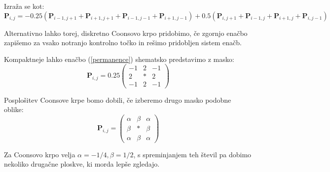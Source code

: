 \documentclass{article}
\begin{document}
Izraža se kot:
\begin{equation}
\textbf{P}_{i,j} = -0.25 (\textbf{P}_{i-1,j+1} + \textbf{P}_{i+1,j+1} + \textbf{P}_{i-1,j-1} + \textbf{P}_{i+1,j-1}) + 0.5 (\textbf{P}_{i,j+1} + \textbf{P}_{i-1,j} + \textbf{P}_{i+1,j} + \textbf{P}_{i,j-1})
\label{permanence}
\end{equation}

Alternativno lahko torej, diskretno Coonsovo krpo pridobimo, če zgornjo enačbo zapišemo za vsako notranjo kontrolno točko in rešimo pridobljen sistem enačb.

Kompaktneje lahko enačbo (\ref{permanence}) shematsko predstavimo z masko:
\begin{equation}
\textbf{P}_{i,j} = 0.25 \begin{pmatrix} -1  & 2 & -1 \\ 2 & * & 2 \\ -1 & 2 & -1\end{pmatrix}
\end{equation}

Posplošitev Coonsove krpe bomo dobili, če izberemo drugo masko podobne oblike:
\begin{equation}
\textbf{P}_{i,j} = \begin{pmatrix} \alpha  & \beta & \alpha \\ \beta & * & \beta \\ \alpha & \beta & \alpha\end{pmatrix}
\end{equation}

Za Coonsovo krpo velja $\alpha = -1/4, \beta = 1/2$, s spreminjanjem teh števil pa dobimo nekoliko drugačne ploskve, ki morda lepše zgledajo. 
\end{document}
